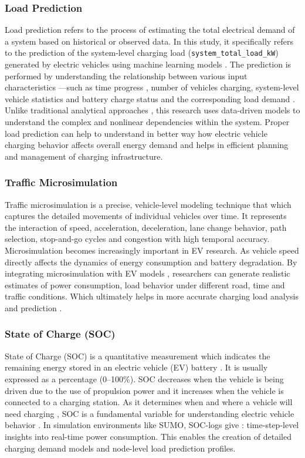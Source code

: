 \documentclass{thesis-library}
\begin{document}
\subsubsection{Load Prediction}
Load prediction refers to the process of estimating the total electrical demand of a system based on historical or observed data. In this study, it specifically refers to the prediction of the system-level charging load (\texttt{system\_total\_load\_kW}) generated by electric vehicles using machine learning models \cite{li2018shortterm}. The prediction is performed by understanding the relationship between various input characteristics ---such as time progress , number of vehicles charging, system-level vehicle statistics and battery charge status and the corresponding load demand . Unlike traditional analytical approaches , this research uses data-driven models to understand the complex and nonlinear dependencies within the system. Proper load prediction can help to understand in better way how electric vehicle charging behavior affects overall energy demand and helps in efficient planning and management of charging infrastructure.

\subsubsection{Traffic Microsimulation}
Traffic microsimulation is a precise, vehicle-level modeling technique that which captures the detailed movements of individual vehicles over time. It represents the interaction of speed, acceleration, deceleration, lane change behavior, path selection, stop-and-go cycles and congestion with high temporal accuracy. Microsimulation becomes increasingly important in EV research. As vehicle speed directly affects the dynamics of energy consumption and battery degradation. By integrating microsimulation with EV models , researchers can generate realistic estimates of power consumption, load behavior under different road, time and traffic conditions. Which ultimately helps in more accurate charging load analysis and prediction .

\subsubsection{State of Charge (SOC)}
State of Charge (SOC) is a quantitative measurement which indicates the remaining energy stored in an electric vehicle (EV) battery \cite{soc_prediction2021}. It is usually expressed as a percentage (0--100\%). SOC decreases when the vehicle is being driven due to the use of propulsion power and it increases when the vehicle is connected to a charging station. As it determines when and where a vehicle will need charging , SOC is a fundamental variable for understanding electric vehicle behavior . In simulation environments like SUMO, SOC-logs give : time-step-level insights into real-time power consumption. This enables the creation of detailed charging demand models and node-level load prediction profiles.
\end{document}
